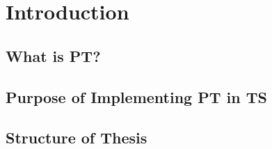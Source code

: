 
\chapter{Introduction}\label{ch:introduction}

\section{What is PT?}\label{sec:what-is-pt?}


\section{Purpose of Implementing PT in TS}\label{sec:purpose-of-implementing-pt-in-ts}


\section{Structure of Thesis}\label{sec:structure-of-thesis}

